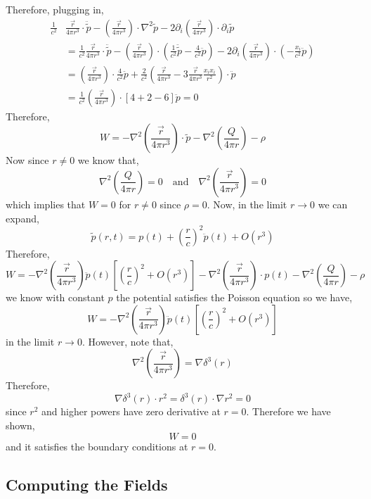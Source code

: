 \documentclass[12pt]{extarticle}
\theoremstyle{definition}
\begin{document}
Therefore, plugging in,
\begin{align*}
\frac{1}{c^2} & \frac{\vec{r}}{4 \pi r^3} \cdot \ddot{\tilde{p}} - \left( \frac{\vec{r}}{4 \pi r^3} \right) \cdot \nabla^2 \tilde{p} - 2 \partial_i \left( \frac{\vec{r}}{4 \pi r^3} \right) \cdot \partial_i \tilde{p}
\\
& = \frac{1}{c^2} \frac{\vec{r}}{4 \pi r^3} \cdot \ddot{\tilde{p}} - \left( \frac{\vec{r}}{4 \pi r^3} \right) \cdot \left( \frac{1}{c^2} \ddot{\tilde{p}} - \frac{4}{c^2} \ddot{p} \right) - 2 \partial_i \left( \frac{\vec{r}}{4 \pi r^3} \right) \cdot \left( - \frac{x_i}{c^2} \ddot{p} \right)
\\
& =  \left( \frac{\vec{r}}{4 \pi r^3} \right) \cdot \frac{4}{c^2} \ddot{p} + \frac{2}{c^2} \left( \frac{\vec{r}}{4 \pi r^3} - 3 \frac{\vec{r}}{4 \pi r^3} \frac{x_i x_i}{r^2} \right) \cdot \ddot{p} 
\\
& = \frac{1}{c^2} \left( \frac{\vec{r}}{4 \pi r^3}  \right) \cdot [4 + 2 - 6]  \ddot{p} = 0
\end{align*}
Therefore,
\[ W = - \nabla^2 \left( \frac{\vec{r}}{4 \pi r^3} \right) \cdot \tilde{p} - \nabla^2 \left( \frac{Q}{4 \pi r} \right) - \rho \]
Now since $r \neq 0$ we know that,
\[ \nabla^2 \left( \frac{Q}{4 \pi r} \right) = 0 \quad \text{and} \quad \nabla^2 \left( \frac{\vec{r}}{4 \pi r^3} \right) = 0 \]
which implies that $W = 0$ for $r \neq 0$ since $\rho = 0$. Now, in the limit $r \to 0$ we can expand,
\[ \tilde{p}(r,t) = p(t) + \left( \frac{r}{c} \right)^2 \ddot{p}(t) + O(r^3) \] 
Therefore,
\[ W = - \nabla^2 \left( \frac{\vec{r}}{4 \pi r^3} \right) \ddot{p}(t) \left[ \left( \frac{r}{c} \right)^2 + O(r^3) \right] - \nabla^2 \left( \frac{\vec{r}}{4 \pi r^3} \right) \cdot p(t) - \nabla^2 \left( \frac{Q}{4 \pi r} \right) - \rho \]
we know with constant $p$ the potential satisfies the Poisson equation so we have,
\[ W = - \nabla^2 \left( \frac{\vec{r}}{4 \pi r^3} \right) \ddot{p}(t)  \left[ \left( \frac{r}{c} \right)^2 + O(r^3) \right] \]
in the limit $r \to 0$. However, note that,
\[ \nabla^2 \left( \frac{\vec{r}}{4 \pi r^3} \right) = \nabla \delta^3(r) \]
Therefore,
\[  \nabla \delta^3(r) \cdot r^2 = \delta^3(r) \cdot \nabla r^2 = 0 \]
since $r^2$ and higher powers have zero derivative at $r = 0$. Therefore we have shown,
\[ W = 0 \]
and it satisfies the boundary conditions at $r = 0$. 
 
\subsection{Computing the Fields} 
\end{document}
